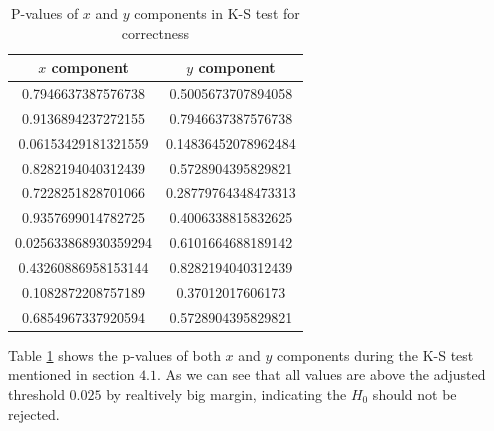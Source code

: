 \documentclass{article}
\begin{document}
\begin{table}[H]
    \centering
    \begin{tabular}{|c|c|}
    \hline
    \textbf{$x$ component} & \textbf{$y$ component} \\
    \hline
    0.7946637387576738 & 0.5005673707894058 \\
    0.9136894237272155 & 0.7946637387576738 \\
    0.06153429181321559 & 0.14836452078962484 \\
    0.8282194040312439 & 0.5728904395829821 \\
    0.7228251828701066 & 0.28779764348473313 \\
    0.9357699014782725 & 0.4006338815832625 \\
    0.025633868930359294 & 0.6101664688189142 \\
    0.43260886958153144 & 0.8282194040312439 \\
    0.1082872208757189 & 0.37012017606173 \\
    0.6854967337920594 & 0.5728904395829821 \\
    \hline
    \end{tabular}
    \caption{P-values of $x$ and $y$ components in K-S test for correctness}
    \label{tab:pvals}
    \end{table}
Table \ref{tab:pvals} shows the p-values of both $x$ and $y$ components during the K-S test mentioned in section $4.1$. As we can see that all values are above the adjusted threshold $0.025$ by realtively big margin, indicating the $H_0$ should not be rejected.
\end{document}
